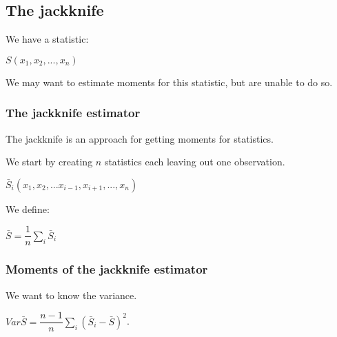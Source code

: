 
\subsection{The jackknife}

We have a statistic:

\(S(x_1, x_2,...,x_n)\)

We may want to estimate moments for this statistic, but are unable to do so.

\subsubsection{The jackknife estimator}

The jackknife is an approach for getting moments for statistics.

We start by creating \(n\) statistics each leaving out one observation. 

\(\bar S_i(x_1,x_2,...x_{i-1},x_{i+1},...,x_n)\)

We define:

\(\bar S=\dfrac{1}{n}\sum_i\bar S_i\)

\subsubsection{Moments of the jackknife estimator}

We want to know the variance.

\(Var \bar S=\dfrac{n-1}{n}\sum_i(\bar S_i-\bar S)^2\).

